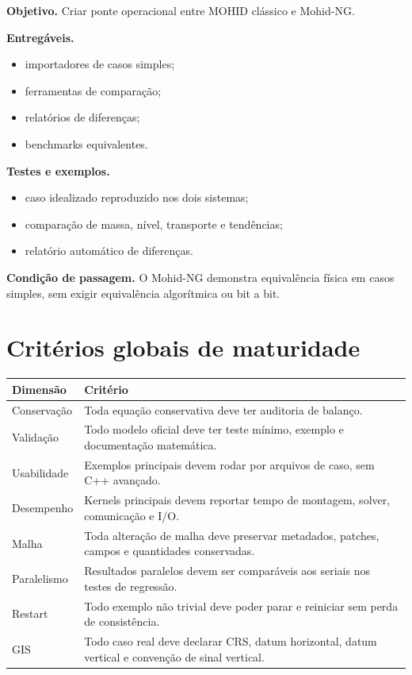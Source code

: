 \documentclass[11pt,a4paper]{article}
\begin{document}
\textbf{Objetivo.} Criar ponte operacional entre MOHID cl\'assico e Mohid-NG.

\textbf{Entreg\'aveis.}
\begin{itemize}
  \item importadores de casos simples;
  \item ferramentas de compara\c{c}\~ao;
  \item relat\'orios de diferen\c{c}as;
  \item benchmarks equivalentes.
\end{itemize}

\textbf{Testes e exemplos.}
\begin{itemize}
  \item caso idealizado reproduzido nos dois sistemas;
  \item compara\c{c}\~ao de massa, n\'ivel, transporte e tend\^encias;
  \item relat\'orio autom\'atico de diferen\c{c}as.
\end{itemize}

\textbf{Condi\c{c}\~ao de passagem.} O Mohid-NG demonstra equival\^encia f\'isica em casos simples, sem exigir equival\^encia algor\'itmica ou bit a bit.

\section{Crit\'erios globais de maturidade}

\begin{longtable}{p{}p{}}
\toprule
\textbf{Dimens\~ao} & \textbf{Crit\'erio}\tabularnewline
\midrule
Conserva\c{c}\~ao & Toda equa\c{c}\~ao conservativa deve ter auditoria de balan\c{c}o.\tabularnewline
Valida\c{c}\~ao & Todo modelo oficial deve ter teste m\'inimo, exemplo e documenta\c{c}\~ao matem\'atica.\tabularnewline
Usabilidade & Exemplos principais devem rodar por arquivos de caso, sem C++ avan\c{c}ado.\tabularnewline
Desempenho & Kernels principais devem reportar tempo de montagem, solver, comunica\c{c}\~ao e I/O.\tabularnewline
Malha & Toda altera\c{c}\~ao de malha deve preservar metadados, patches, campos e quantidades conservadas.\tabularnewline
Paralelismo & Resultados paralelos devem ser compar\'aveis aos seriais nos testes de regress\~ao.\tabularnewline
Restart & Todo exemplo n\~ao trivial deve poder parar e reiniciar sem perda de consist\^encia.\tabularnewline
GIS & Todo caso real deve declarar CRS, datum horizontal, datum vertical e conven\c{c}\~ao de sinal vertical.\tabularnewline
\bottomrule
\end{longtable}
\end{document}
